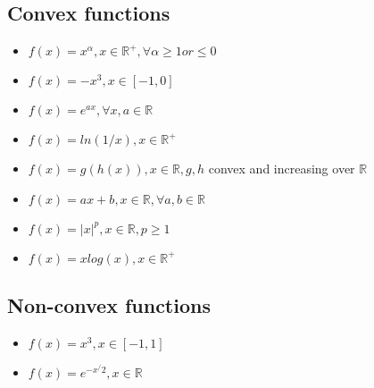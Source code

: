 \subsection{Convex functions}
\begin{itemize}
\item $f(x) = x^{\alpha}, x \in \mathbb{R^+}, \forall \alpha \ge 1 or \le 0$
\item $f(x) = -x^3, x \in [-1,0]$
\item $f(x) = e^{ax}, \forall x,a \in \mathbb{R}$
\item $f(x) = ln(1/x), x \in \mathbb{R^+}$
\item $f(x) = g(h(x)), x \in \mathbb{R}, g,h$ convex and increasing over $\mathbb{R}$
\item $f(x) = ax+b, x \in \mathbb{R}, \forall a,b \in \mathbb{R}$
\item $f(x) = |x|^p, x \in \mathbb{R}, p\ge 1$
\item $f(x) = xlog(x), x \in \mathbb{R}^+$

\end{itemize}

\subsection{Non-convex functions}
\begin{itemize}
\item $f(x) = x^3, x \in [-1,1]$
\item $f(x) = e^{-x^/2}, x \in \mathbb{R}$

\end{itemize}